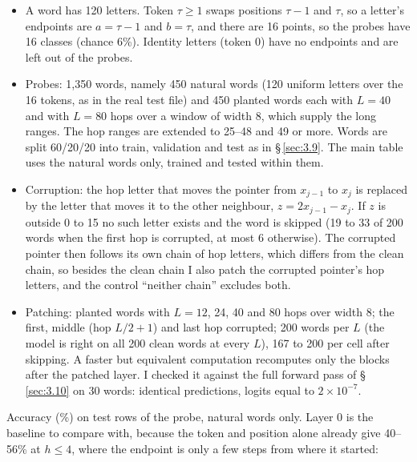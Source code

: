 \documentclass[paper=a4,fontsize=11pt,DIV=11,parskip=half,headings=small,numbers=noendperiod]{scrartcl}
\begin{document}
\begin{itemize}
\item A word has 120 letters. Token $\tau\ge1$ swaps positions $\tau-1$ and $\tau$, so a letter’s endpoints are
  $a=\tau-1$ and $b=\tau$, and there are 16 points, so the probes have 16 classes (chance 6\%). Identity letters
  (token 0) have no endpoints and are left out of the probes.
\item Probes: 1,350 words, namely 450 natural words (120 uniform letters over the 16 tokens, as in the real test
  file) and 450 planted words each with $L=40$ and with $L=80$ hops over a window of width 8, which supply the
  long ranges. The hop ranges are extended to 25–48 and 49 or more. Words are split 60/20/20 into train,
  validation and test as in \S\,\ref{sec:3.9}. The main table uses the natural words only, trained and tested
  within them.
\item Corruption: the hop letter that moves the pointer from $x_{j-1}$ to $x_j$ is replaced by the letter that
  moves it to the other neighbour, $z=2x_{j-1}-x_j$. If $z$ is outside 0 to 15 no such letter exists and the
  word is skipped (19 to 33 of 200 words when the first hop is corrupted, at most 6 otherwise). The corrupted
  pointer then follows its own chain of hop letters, which differs from the clean chain, so besides the clean
  chain I also patch the corrupted pointer’s hop letters, and the control “neither chain” excludes both.
\item Patching: planted words with $L=12$, 24, 40 and 80 hops over width 8; the first, middle (hop $L/2+1$) and
  last hop corrupted; 200 words per $L$ (the model is right on all 200 clean words at every $L$), 167 to 200 per
  cell after skipping. A faster but equivalent computation recomputes only the blocks after the patched layer. I
  checked it against the full forward pass of \S\,\ref{sec:3.10} on 30 words: identical predictions, logits
  equal to $2\times10^{-7}$.
\end{itemize}

Accuracy (\%) on test rows of the probe, natural words only. Layer 0 is the baseline to compare with, because
the token and position alone already give 40–56\% at $h\le4$, where the endpoint is only a few steps from where
it started:
\end{document}

